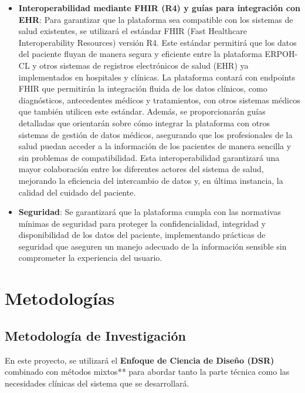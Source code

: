 \documentclass{article}
\begin{document}
\begin{itemize}[leftmargin=1.2em]
\item \textbf{Interoperabilidad mediante FHIR (R4) y guías para integración con EHR}:
Para garantizar que la plataforma sea compatible con los sistemas de salud existentes, se utilizará el estándar FHIR (Fast Healthcare Interoperability Resources) versión R4. Este estándar permitirá que los datos del paciente fluyan de manera segura y eficiente entre la plataforma ERPOH-CL y otros sistemas de registros electrónicos de salud (EHR) ya implementados en hospitales y clínicas. La plataforma contará con endpoints FHIR que permitirán la integración fluida de los datos clínicos, como diagnósticos, antecedentes médicos y tratamientos, con otros sistemas médicos que también utilicen este estándar. Además, se proporcionarán guías detalladas que orientarán sobre cómo integrar la plataforma con otros sistemas de gestión de datos médicos, asegurando que los profesionales de la salud puedan acceder a la información de los pacientes de manera sencilla y sin problemas de compatibilidad. Esta interoperabilidad garantizará una mayor colaboración entre los diferentes actores del sistema de salud, mejorando la eficiencia del intercambio de datos y, en última instancia, la calidad del cuidado del paciente.

\item \textbf{Seguridad}: Se garantizará que la plataforma cumpla con las normativas mínimas de seguridad para proteger la confidencialidad, integridad y disponibilidad de los datos del paciente, implementando prácticas de seguridad que aseguren un manejo adecuado de la información sensible sin comprometer la experiencia del usuario.



\end{itemize}

\section{Metodologías}

\subsection{Metodología de Investigación}
En este proyecto, se utilizará el \textbf{Enfoque de Ciencia de Diseño (DSR)} combinado con métodos mixtos** para abordar tanto la parte técnica como las necesidades clínicas del sistema que se desarrollará.
\end{document}
